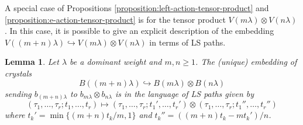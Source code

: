 \documentclass[final]{amsart}
\theoremstyle{plain}
\newtheorem{lemma}[corollary]{Lemma}
\theoremstyle{definition}
\begin{document}
A special case of Propositions \ref{proposition:left-action-tensor-product} and \ref{proposition:e-action-tensor-product} is for the tensor product $V(m\lambda) \otimes V(n\lambda)$.
In this case, it is possible to give an explicit description of the embedding $V((m+n)\lambda) \hookrightarrow V(m\lambda) \otimes V(n\lambda)$ in terms of LS paths.

\begin{lemma}
    \label{lemma:crystal-cartan-embedding}
    Let $\lambda$ be a dominant weight and $m, n \ge 1$.
    The (unique) embedding of crystals
    \[
        B((m+n)\lambda) \hookrightarrow B(m\lambda) \otimes B(n\lambda)
    \]
    sending $b_{(m+n)\lambda}$ to $b_{m\lambda} \otimes b_{n\lambda}$ is in the language of LS paths given by
    \[
        (\tau_1, \dots, \tau_r; t_1, \dots, t_r) \mapsto (\tau_1, \dots, \tau_r; t_1', \dots, t_r') \otimes (\tau_1, \dots, \tau_r; t_1'', \dots, t_r'')
    \]
    where $t_k' = \min\{(m+n)t_k/m, 1\}$ and $t_k'' = ((m+n)t_k - m t_k')/n$.
\end{lemma}
\end{document}
